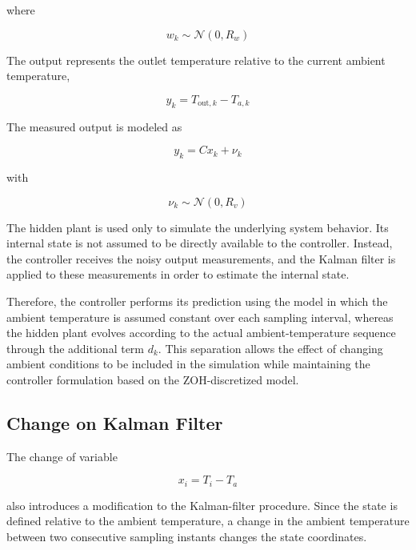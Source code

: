 where

\begin{equation}
    w_k
    \sim
    \mathcal{N}(0,R_w)
\end{equation}

The output represents the outlet temperature relative to the current ambient
temperature,

\begin{equation}
    y_k
    =
    T_{\mathrm{out},k}
    -
    T_{a,k}
\end{equation}

The measured output is modeled as

\begin{equation}
    \boxed{
    y_k
    =
    Cx_k+\nu_k
    }
    \label{eq:district_hidden_output}
\end{equation}

with

\begin{equation}
    \nu_k
    \sim
    \mathcal{N}(0,R_v)
\end{equation}

The hidden plant is used only to simulate the underlying system behavior.
Its internal state is not assumed to be directly available to the
controller. Instead, the controller receives the noisy output measurements,
and the Kalman filter is applied to these measurements in order to estimate
the internal state.

Therefore, the controller performs its prediction using the model in which
the ambient temperature is assumed constant over each sampling interval,
whereas the hidden plant evolves according to the actual ambient-temperature
sequence through the additional term \(d_k\). This separation allows the
effect of changing ambient conditions to be included in the simulation while
maintaining the controller formulation based on the ZOH-discretized model.

\subsection{Change on Kalman Filter}
\label{subsec:district_kalman_change}

The change of variable

\begin{equation}
    x_i=T_i-T_a
\end{equation}

also introduces a modification to the Kalman-filter procedure. Since the
state is defined relative to the ambient temperature, a change in the ambient
temperature between two consecutive sampling instants changes the state
coordinates.

